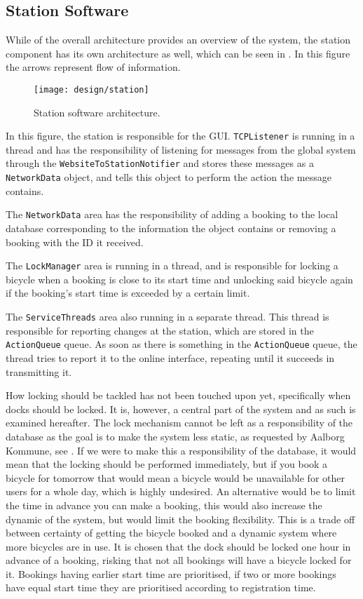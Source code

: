 \subsection{Station Software}\label{subsec:stationsoftdesfgi}
While  of the overall architecture provides an overview of the system, the station component has its own architecture as well, which can be seen in . In this figure the arrows represent flow of information.

\begin{figure}[h]
	\centering
	\texttt{[image: design/station]}
	\caption{Station software architecture.}\label{fig:stationarch}
\end{figure}

In this figure, the station is responsible for the GUI.
\texttt{TCPListener} is running in a thread and has the responsibility of listening for messages from the global system through the \texttt{Website\-ToStationNotifier} and stores these messages as a \texttt{NetworkData} object, and tells this object to perform the action the message contains.

The \texttt{NetworkData} area has the responsibility of adding a booking to the local database corresponding to the information the object contains or removing a booking with the ID it received.

The \texttt{LockManager} area is running in a thread, and is responsible for locking a bicycle when a booking is close to its start time and unlocking said bicycle again if the booking's start time is exceeded by a certain limit.

The \texttt{ServiceThreads} area also running in a separate thread.
This thread is responsible for reporting changes at the station, which are stored in the \texttt{ActionQueue} queue.
As soon as there is something in the \texttt{ActionQueue} queue, the thread tries to report it to the online interface, repeating until it succeeds in transmitting it.

How locking should be tackled has not been touched upon yet, specifically when docks should be locked.
It is, however, a central part of the system and as such is examined hereafter.
The lock mechanism cannot be left as a responsibility of the database as the goal is to make the system less static, as requested by Aalborg Kommune, see .
If we were to make this a responsibility of the database, it would mean that the locking should be performed immediately, but if you book a bicycle for tomorrow that would mean a bicycle would be unavailable for other users for a whole day, which is highly undesired.
An alternative would be to limit the time in advance you can make a booking, this would also increase the dynamic of the system, but would limit the booking flexibility.
This is a trade off between certainty of getting the bicycle booked and a dynamic system where more bicycles are in use.
It is chosen that the dock should be locked one hour in advance of a booking, risking that not all bookings will have a bicycle locked for it.
Bookings having earlier start time are prioritised, if two or more bookings have equal start time they are prioritised according to registration time.
